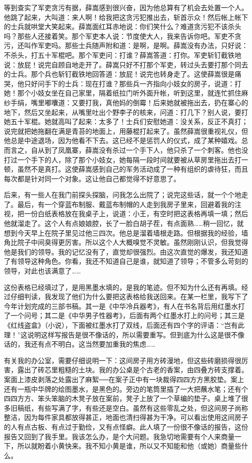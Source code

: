 等到查实了军吏贪污有据，薛嵩感到很兴奋，因为他总算有了机会去处置一个人。他跳了起来，大叫道：来人啊！给我把这贪污犯推出去，斩首示众！然后帐上帐下的士兵就哄堂大笑起来。薛嵩面红耳赤地说：你们笑什么？难道贪污犯不该杀头吗？那些人还接着笑。那个军吏本人说：节度使大人，我来告诉你吧。军吏不贪污，还叫作军吏吗。那些士兵随声附和道：是啊，是啊。薛嵩没有办法，只好说：不杀头，打五十军棍吧。那个军吏问：打谁？薛嵩答道：打你。军吏斩钉截铁地说：放屁！说完自顾自地走开了。薛嵩只好不打那个军吏，转过头去要打那个同去的士兵。那个兵也斩钉截铁地回答道：放屁！说完也转身走了。这使薛嵩很是痛哭，他只好问手下的士兵：现在打谁？那些兵一齐指向小妓女的房子，说道：打她！那个小妓女坐在自己家里，隔着纸拉门听外面升帐，听到这里，就连忙抓住麻纱手绢，嘴里嘟囔道：又要打我，真他妈的倒霉！后来她就被拖出去，扔在寨心的地下，然后又坐起来，从嘴里吐出个野李子的核来，问道：打几下？别人说，要打她五十军棍。她就高叫了起来：太多了！士兵们安慰她道：没关系，反正不真打；说完就把她拖翻在满是青苔的地面上，用藤棍打起来了。虽然薛嵩很重视礼仪，但他总是中途退场，因为他看不下去。这已经不是惩罚人的仪式，成了某种嬉戏。总而言之，自从到了凤凰寨，薛嵩没有杀过一个手下人，他只杀了一个刺客。他也没打过一个手下的人，除了那个小妓女，她每隔一段时间就要被从草房里拖出去打一顿，虽然不是真打。这使薛嵩感到自己的军务活动成了一种有组织的虐待狂，而且每次都是针对同一个对象。这让他自己都觉得不好意思了。 

后来，有一些人在我门前探头探脑，问我怎么出院了；说完这些话，就一个个地走了。最后，有一个穿蓝布制服、戴蓝布制帽的人走到我房子里来，回避着我的注视，把一份白纸表格放在我桌子上，说道：小王，有空时把这表格再填一填；然后他就溜走了。这个人有点娘娘腔，长了一脸白胡子茬，有点面熟……稍一回忆，就想到今天早上在院子里见过他三四次。他总是溜着墙根走路。但根据我的经验，墙角比院子中间臭得更厉害。所以这个人大概嗅觉不灵敏。虽然刚刚认识，但我觉得他是我们的领导。我的记忆没有了，直觉却很强烈。由这次直觉的爆发，我还知道了有领导这种角色。你看，我还不知道自己是谁，就知道了领导；不管多么苛刻的领导，对此也该满意了…… 

这份表格已经填过了，是用黑墨水填的，是我的笔迹。但不知为什么还有再填。经过仔细判读，我发现了他们为什么要把这表格给我送回来。在某一栏里，我写下了今年计划完成的三部书稿。其一是《中华冷兵器考》，有人在书名背后用红墨水打了一个问号；其二是《中华男子性器考》，后面有两个红墨水打上的问号；其三是《红线盗盒》（小说），下面被红墨水打了双线，后面还有四个字的评语：“岂有此理！”这说明这样写报告是很不像话的，所以需要重写。但到底为什么这是很不像话的，我还有点不明白。这当然要加重我的焦虑…… 

有关我的办公室，需要仔细说明一下：这间房子用方砖漫地，但这些砖磨损得很厉害，露出了砖芯里粗糙的土块。我的办公桌是个古老的香案，由四叠方砖支撑着。案面上漆皮剥落之处露出了麻絮──在案子正中有一块裁得四四方方黑胶垫。案上还有一瓶中华牌的绘图墨水，是黑色的。旁边的笔筒里插了一大把蘸水笔；还有个四四方方、笨头笨脑的木凳子放在案前，凳子上放了一个草编的垫子。桌上堆了很多旧稿纸，有些写满了字，有些还是空白。虽然有这些零乱之处，但这间房子尚称整洁，因为每件家具都放得甚正，地面也清扫得甚为干净。可以看出使用这间房子的人有点古板、有点过于勤俭，又有点怪癖。此人填了一份很不像话的报告，这份报告又回到了我手里。我该怎么办，是个大问题。我急切地需要有个人来商量一下，所以就盼着小黄快来。我不知小黄是谁，所以又不知能和他（或她）商量些什么。 

